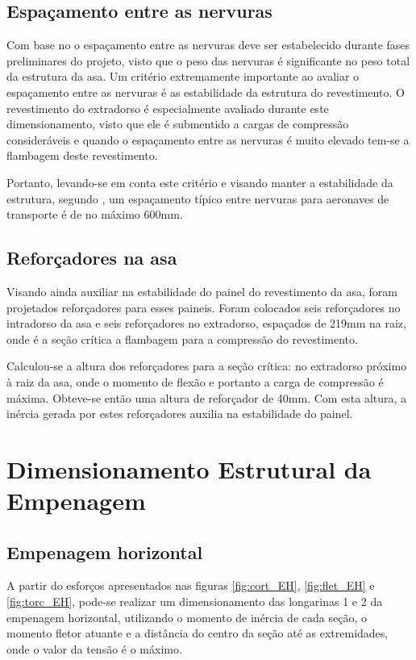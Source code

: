 \subsection{Espaçamento entre as nervuras}
Com base no \cite{niu1999airframe} o espaçamento entre as nervuras deve ser estabelecido durante fases preliminares do projeto, visto que o peso das nervuras é significante no peso total da estrutura da asa.
Um critério extremamente importante ao avaliar o espaçamento entre as nervuras é as estabilidade da estrutura do revestimento.
O revestimento do extradorso é especialmente avaliado durante este dimensionamento, visto que ele é submentido a cargas de compressão consideráveis e quando o espaçamento entre as nervuras é muito elevado tem-se a flambagem deste revestimento.

Portanto, levando-se em conta este critério e visando manter a estabilidade da estrutura, segundo \cite{roskam}, um espaçamento típico entre nervuras para aeronaves de transporte é de no máximo 600mm.

\subsection{Reforçadores na asa}
Visando ainda auxiliar na estabilidade do painel do revestimento da asa, foram projetados reforçadores para esses paineis.
Foram colocados seis reforçadores no intradorso da asa e seis reforçadores no extradorso, espaçados de 219mm na raiz, onde é a seção crítica a flambagem para a compressão do revestimento.

Calculou-se a altura dos reforçadores para a seção crítica: no extradorso próximo à raiz da asa, onde o momento de flexão e portanto a carga de compressão é máxima.
Obteve-se então uma altura de reforçador de 40mm.
Com esta altura, a inércia gerada por estes reforçadores auxilia na estabilidade do painel.



\section{Dimensionamento Estrutural da Empenagem}

\subsection{Empenagem horizontal}
A partir do esforços apresentados nas figuras \ref{fig:cort_EH}, \ref{fig:flet_EH} e \ref{fig:torc_EH}, pode-se realizar um dimensionamento das longarinas 1 e 2 da empenagem horizontal, utilizando o momento de inércia de cada seção, o momento fletor atuante e a distância do centro da seção até as extremidades, onde o valor da tensão é o máximo.

